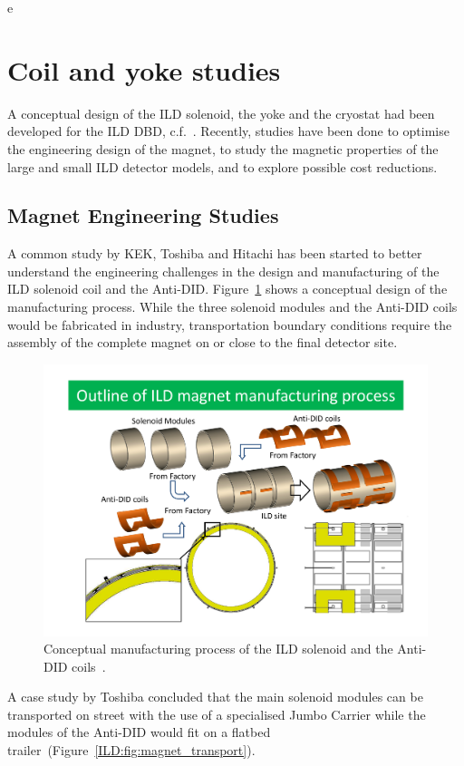 e\section{Coil and yoke studies}

A conceptual design of the ILD solenoid, the yoke and the cryostat had been developed for the ILD DBD, c.f.~\cite{ild:bib:Magnet_Note, ild:bib:Cryostat_Note}. Recently, studies have been done to optimise the engineering design of the magnet, to study the magnetic properties of the large and small ILD detector models, and to explore possible cost reductions.

\subsection{Magnet Engineering Studies}
A common study by KEK, Toshiba and Hitachi has been started to better understand the engineering challenges in the design and manufacturing of the ILD solenoid coil and the Anti-DID. Figure~\ref{ILD:fig:solenoid_manufacturing} shows a conceptual design of the manufacturing process. While the three solenoid modules and the Anti-DID coils would be fabricated in industry, transportation boundary conditions require the assembly of the complete magnet on or close to the final detector site.
\begin{figure}[h!]
    \centering
    \includegraphics[width=0.8\hsize]{Integration/fig/Solenoid_Manufacturing.pdf}
    \caption{Conceptual manufacturing process of the ILD solenoid and the Anti-DID coils~\cite{ild:bib:Solenoid_Manufacturing}.}
    \label{ILD:fig:solenoid_manufacturing}
\end{figure}
A case study by Toshiba concluded that the main solenoid modules can be transported on street with the use of a specialised Jumbo Carrier while the modules of the Anti-DID would fit on a flatbed trailer~(Figure~\ref{ILD:fig:magnet_transport}).
